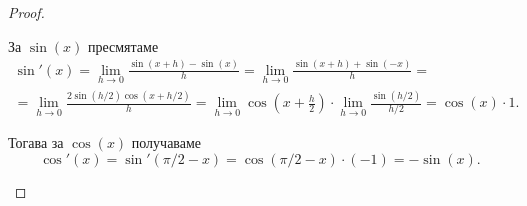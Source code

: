 \documentclass[numbers=endperiod, DIV=15, bibliography=totocnumbered]{scrartcl}
\begin{document}
\begin{proof}
\begin{enumerate}
    За $\sin(x)$ пресмятаме
    \begin{multline*}
      \sin'(x)
      =
      \lim_{h \to 0} \frac {\sin(x+h) - \sin(x)} h
      =
      \lim_{h \to 0} \frac {\sin(x+h) + \sin(-x)} h
      = \\ =
      \lim_{h \to 0} \frac {2 \sin(h / 2) \cos(x+h/2)} h
      =
      \lim_{h \to 0} \cos \left(x + \frac h 2 \right) \cdot \lim_{h \to 0} \frac {\sin(h / 2)} {h/2}
      =
      \cos(x) \cdot 1.
    \end{multline*}

    Тогава за $\cos(x)$ получаваме
    \begin{displaymath}
      \cos'(x) = \sin'(\pi / 2 - x) = \cos(\pi / 2 - x) \cdot (-1) = -\sin(x).
    \end{displaymath}
  \end{enumerate}
\end{proof}

\printbibliography
\end{document}
